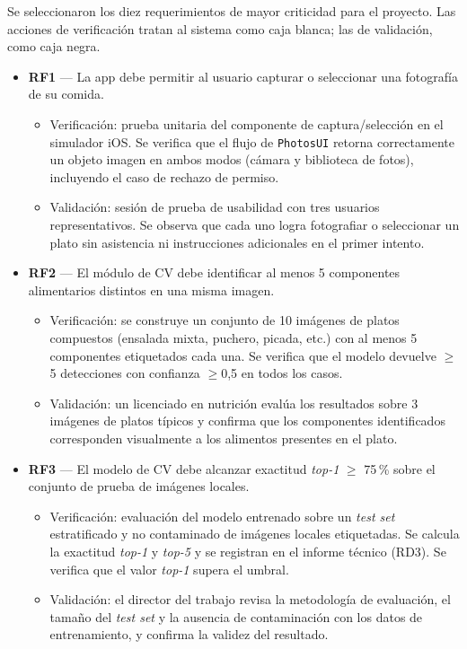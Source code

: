 \documentclass[
11pt, %
]{charter}
\begin{document}
Se seleccionaron los diez requerimientos de mayor criticidad para el proyecto. Las acciones de verificación tratan al sistema como caja blanca; las de validación, como caja negra.

\begin{itemize}

\item \textbf{RF1} --- La app debe permitir al usuario capturar o seleccionar una fotografía de su comida.
\begin{itemize}
	\item Verificación: prueba unitaria del componente de captura/selección en el simulador iOS. Se verifica que el flujo de \texttt{PhotosUI} retorna correctamente un objeto imagen en ambos modos (cámara y biblioteca de fotos), incluyendo el caso de rechazo de permiso.
	\item Validación: sesión de prueba de usabilidad con tres usuarios representativos. Se observa que cada uno logra fotografiar o seleccionar un plato sin asistencia ni instrucciones adicionales en el primer intento.
\end{itemize}

\item \textbf{RF2} --- El módulo de CV debe identificar al menos 5 componentes alimentarios distintos en una misma imagen.
\begin{itemize}
	\item Verificación: se construye un conjunto de 10 imágenes de platos compuestos (ensalada mixta, puchero, picada, etc.) con al menos 5 componentes etiquetados cada una. Se verifica que el modelo devuelve $\geq$5 detecciones con confianza $\geq$0,5 en todos los casos.
	\item Validación: un licenciado en nutrición evalúa los resultados sobre 3 imágenes de platos típicos y confirma que los componentes identificados corresponden visualmente a los alimentos presentes en el plato.
\end{itemize}

\item \textbf{RF3} --- El modelo de CV debe alcanzar exactitud \textit{top-1} $\geq$ 75\,\% sobre el conjunto de prueba de imágenes locales.
\begin{itemize}
	\item Verificación: evaluación del modelo entrenado sobre un \textit{test set} estratificado y no contaminado de imágenes locales etiquetadas. Se calcula la exactitud \textit{top-1} y \textit{top-5} y se registran en el informe técnico (RD3). Se verifica que el valor \textit{top-1} supera el umbral.
	\item Validación: el director del trabajo revisa la metodología de evaluación, el tamaño del \textit{test set} y la ausencia de contaminación con los datos de entrenamiento, y confirma la validez del resultado.
\end{itemize}


\end{itemize}
\end{document}

